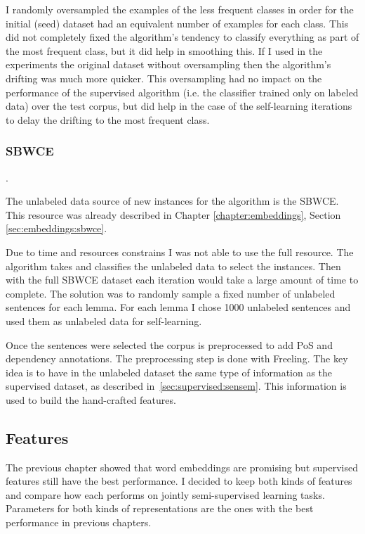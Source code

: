 I randomly oversampled the examples of the less frequent classes in order for
the initial (seed) dataset had an equivalent number of examples for each class.
This did not completely fixed the algorithm's tendency to classify everything
as part of the most frequent class, but it did help in smoothing this. If I
used in the experiments the original dataset without oversampling then the
algorithm's drifting was much more quicker. This oversampling had no impact on
the performance of the supervised algorithm (i.e. the classifier trained only
on labeled data) over the test corpus, but did help in the case of the
self-learning iterations to delay the drifting to the most frequent class.

\subsubsection{SBWCE}\label{sec:self-learning:sbwce}.

The unlabeled data source of new instances for the algorithm is the SBWCE.
This resource was already described in Chapter \ref{chapter:embeddings},
Section \ref{sec:embeddings:sbwce}.

Due to time and resources constrains I was not able to use the full resource.
The algorithm takes and classifies the unlabeled data to select the instances.
Then with the full SBWCE dataset each iteration would take a large amount of
time to complete. The solution was to randomly sample a fixed number of
unlabeled sentences for each lemma. For each lemma I chose 1000 unlabeled
sentences and used them as unlabeled data for self-learning.

Once the sentences were selected the corpus is preprocessed to add PoS and
dependency annotations. The preprocessing step is done with Freeling. The key
idea is to have in the unlabeled dataset the same type of information as the
supervised dataset, as described in~\ref{sec:supervised:sensem}. This
information is used to build the hand-crafted features.

\subsection{Features}\label{sec:self-learning:features}

The previous chapter showed that word embeddings are promising but supervised
features still have the best performance. I decided to keep both kinds of
features and compare how each performs on jointly semi-supervised learning
tasks. Parameters for both kinds of representations are the ones with the best
performance in previous chapters.

